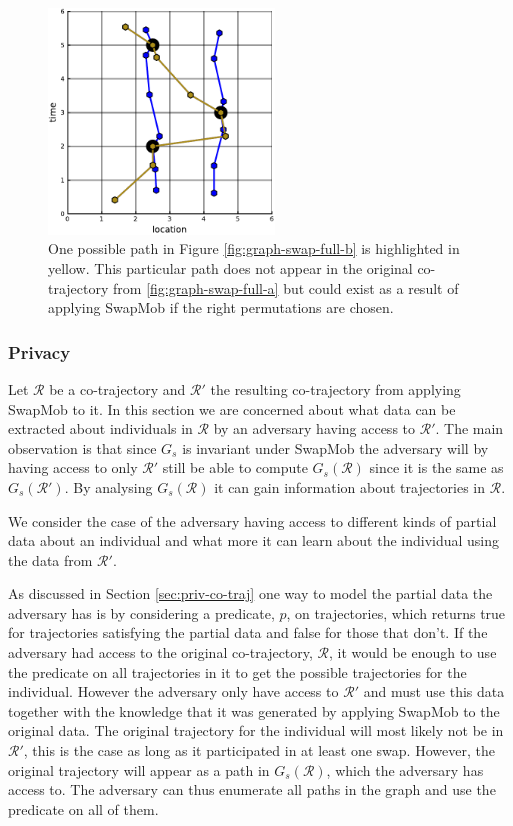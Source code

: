 \documentclass[12pt]{article}
\newcommand{\cotraj}{\mathcal{R}}
\newcommand{\pred}{p}
\newcommand{\swapgraph}{G_s}
\theoremstyle{definition}
\begin{document}
\begin{figure}
  \centering
  \includegraphics[width=6cm]{graph_swap_full-c.pdf}
  \caption{One possible path in Figure \ref{fig:graph-swap-full-b} is
    highlighted in yellow. This particular path does not appear in the
    original co-trajectory from \ref{fig:graph-swap-full-a} but could
    exist as a result of applying SwapMob if the right permutations
    are chosen.}
  \label{fig:graph-swap-full-c}
\end{figure}

\subsubsection{Privacy}
Let \(\cotraj\) be a co-trajectory and \(\cotraj'\) the resulting
co-trajectory from applying SwapMob to it. In this section we are
concerned about what data can be extracted about individuals in
\(\cotraj\) by an adversary having access to \(\cotraj'\). The main
observation is that since \(\swapgraph\) is invariant under SwapMob
the adversary will by having access to only \(\cotraj'\) still be able
to compute \(\swapgraph(\cotraj)\) since it is the same as
\(\swapgraph(\cotraj')\). By analysing \(\swapgraph(\cotraj)\) it can
gain information about trajectories in \(\cotraj\).

We consider the case of the adversary having access to different kinds
of partial data about an individual and what more it can learn about
the individual using the data from \(\cotraj'\).

As discussed in Section \ref{sec:priv-co-traj} one way to model the
partial data the adversary has is by considering a predicate,
\(\pred\), on trajectories, which returns true for trajectories
satisfying the partial data and false for those that don't. If the
adversary had access to the original co-trajectory, \(\cotraj\), it
would be enough to use the predicate on all trajectories in it to get
the possible trajectories for the individual. However the adversary
only have access to \(\cotraj'\) and must use this data together with
the knowledge that it was generated by applying SwapMob to the
original data. The original trajectory for the individual will most
likely not be in \(\cotraj'\), this is the case as long as it
participated in at least one swap. However, the original trajectory
will appear as a path in \(\swapgraph(\cotraj)\), which the adversary
has access to. The adversary can thus enumerate all paths in the graph
and use the predicate on all of them.
\end{document}
